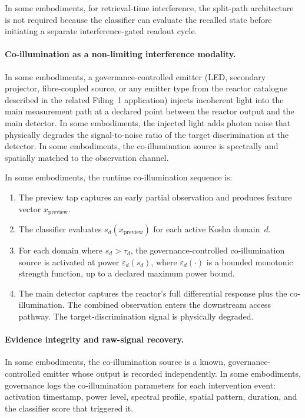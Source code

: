 \documentclass[a4paper,12pt]{article}
\begin{document}
In some embodiments, for retrieval-time interference, the split-path
architecture is not required because the classifier can evaluate the
recalled state before initiating a separate interference-gated
readout cycle.

\paragraph{Co-illumination as a non-limiting interference modality.}
In some embodiments, a governance-controlled emitter (LED, secondary
projector, fibre-coupled source, or any emitter type from the reactor
catalogue described in the related Filing~1 application) injects
incoherent light into the main measurement path at a declared point
between the reactor output and the main detector. In some
embodiments, the injected light adds photon noise that physically
degrades the signal-to-noise ratio of the target discrimination at
the detector. In some embodiments, the co-illumination source is
spectrally and spatially matched to the observation channel.

In some embodiments, the runtime co-illumination sequence is:

\begin{enumerate}
  \item The preview tap captures an early partial observation and
    produces feature vector $x_{\mathrm{preview}}$.
  \item The classifier evaluates $s_d(x_{\mathrm{preview}})$ for
    each active Kosha domain~$d$.
  \item For each domain where $s_d > \tau_d$, the
    governance-controlled co-illumination source is activated at
    power $\varepsilon_d(s_d)$, where $\varepsilon_d(\cdot)$ is a
    bounded monotonic strength function, up to a declared maximum
    power bound.
  \item The main detector captures the reactor's full differential
    response plus the co-illumination. The combined observation
    enters the downstream access pathway. The target-discrimination
    signal is physically degraded.
\end{enumerate}

\paragraph{Evidence integrity and raw-signal recovery.}
In some embodiments, the co-illumination source is a known,
governance-controlled emitter whose output is recorded independently.
In some embodiments, governance logs the co-illumination parameters
for each intervention event: activation timestamp, power level,
spectral profile, spatial pattern, duration, and the classifier score
that triggered it.
\end{document}
